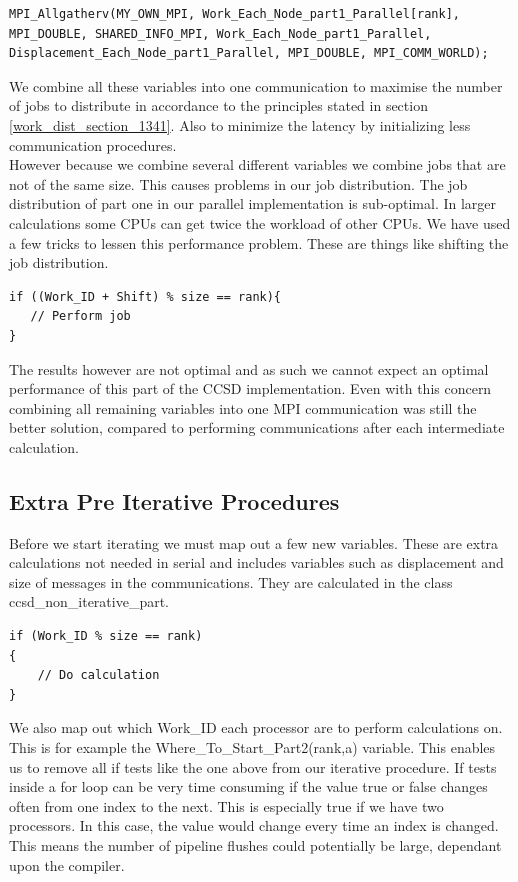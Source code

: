\documentclass[a4paper,norsk,11pt,twoside]{report}
\begin{document}
\begin{lstlisting}
MPI_Allgatherv(MY_OWN_MPI, Work_Each_Node_part1_Parallel[rank], MPI_DOUBLE, SHARED_INFO_MPI, Work_Each_Node_part1_Parallel, Displacement_Each_Node_part1_Parallel, MPI_DOUBLE, MPI_COMM_WORLD);
\end{lstlisting}

We combine all these variables into one communication to maximise the number of jobs to distribute in accordance to the principles stated in section \ref{work_dist_section_1341}. Also to minimize the latency by initializing less communication procedures. \\

However because we combine several different variables we combine jobs that are not of the same size. This causes problems in our job distribution. The job distribution of part one in our parallel implementation is sub-optimal. In larger calculations some CPUs can get twice the workload of other CPUs. We have used a few tricks to lessen this performance problem. These are things like shifting the job distribution.

\begin{lstlisting}
if ((Work_ID + Shift) % size == rank){
   // Perform job
}
\end{lstlisting}

The results however are not optimal and as such we cannot expect an optimal performance of this part of the CCSD implementation. Even with this concern combining all remaining variables into one MPI communication was still the better solution, compared to performing communications after each intermediate calculation.   

\newpage

\subsection{Extra Pre Iterative Procedures}
Before we start iterating we must map out a few new variables. These are extra calculations not needed in serial and includes variables such as displacement and size of messages in the communications. They are calculated in the class \\ ccsd\_non\_iterative\_part. \\

\begin{lstlisting}
if (Work_ID % size == rank)
{
    // Do calculation
}
\end{lstlisting}

We also map out which Work\_ID each processor are to perform calculations on. This is for example the Where\_To\_Start\_Part2(rank,a) variable. This enables us to remove all if tests like the one above from our iterative procedure. If tests inside a for loop can be very time consuming if the value true or false changes often from one index to the next. This is especially true if we have two processors. In this case, the value would change every time an index is changed. This means the number of pipeline flushes could potentially be large, dependant upon the compiler. \\
\end{document}
